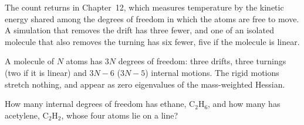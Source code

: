 The count returns in Chapter~12, which measures temperature by the kinetic
energy shared among the degrees of freedom in which the atoms are free to
move. A simulation that removes the drift has three fewer, and one of an
isolated molecule that also removes the turning has six fewer, five if the
molecule is linear.

\begin{keyidea}
A molecule of $N$ atoms has $3N$ degrees of freedom: three drifts, three
turnings (two if it is linear) and $3N - 6$ ($3N - 5$) internal motions.
The rigid motions stretch nothing, and appear as zero eigenvalues of the
mass-weighted Hessian.
\end{keyidea}


\begin{selfcheck}
How many internal degrees of freedom has ethane, C$_2$H$_6$, and how many
has acetylene, C$_2$H$_2$, whose four atoms lie on a line?
\end{selfcheck}
